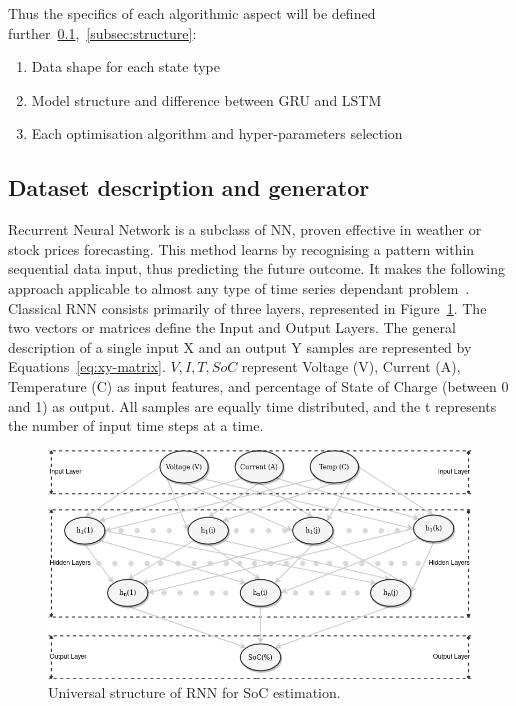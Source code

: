 %
%
Thus the specifics of each algorithmic aspect will be defined further~\ref{subsec:dataset},~\ref{subsec:structure}:
\begin{enumerate}[1)]
    \item Data shape for each state type
    \item Model structure and difference between GRU and LSTM
    \item Each optimisation algorithm and hyper-parameters selection
\end{enumerate}

%
%
\subsection{Dataset description and generator} \label{subsec:dataset}
Recurrent Neural Network is a subclass of NN, proven effective in weather or stock prices forecasting.
This method learns by recognising a pattern within sequential data input, thus predicting the future outcome.
It makes the following approach applicable to almost any type of time series dependant problem~\cite{anton_battery_2013}.
Classical RNN consists primarily of three layers, represented in \mbox{Figure~\ref{fig:RNN-structure}}.
The two vectors or matrices define the Input and Output Layers.
The general description of a single input X and an output Y samples are represented by \mbox{Equations~\ref{eq:xy-matrix}}.
$V, I, T, SoC$ represent Voltage (V), Current (A), Temperature (\textdegree{}C) as input features, and percentage of State of Charge (between 0 and 1) as output.
All samples are equally time distributed, and the t represents the number of input time steps at a time.
\begin{figure}[htbp]
    \centering
    \includegraphics[width=\columnwidth]{II_Body/images/SoC-RNN.png}
    \caption{Universal structure of RNN for SoC estimation.}
    \label{fig:RNN-structure}
\end{figure}
